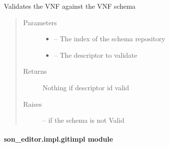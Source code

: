 \documentclass[letterpaper,10pt,english]{sphinxmanual}
\begin{document}
\begin{fulllineitems}
\label{_source/son_editor.impl:son_editor.impl.functionsimpl.validate_vnf}
Validates the VNF against the VNF schema
\begin{quote}\begin{description}
\item[{Parameters}] \leavevmode\begin{itemize}
\item {} 
 -- The index of the schema repository

\item {} 
 -- The descriptor to validate

\end{itemize}

\item[{Returns}] \leavevmode
Nothing if descriptor id valid

\item[{Raises}] \leavevmode
{\hyperref[_source/son_editor.app:son_editor.app.exceptions.InvalidArgument]{}} -- if the schema is not Valid

\end{description}\end{quote}

\end{fulllineitems}



\paragraph{son\_editor.impl.gitimpl module}
\label{_source/son_editor.impl:module-son_editor.impl.gitimpl}\label{_source/son_editor.impl:son-editor-impl-gitimpl-module}
\end{document}
